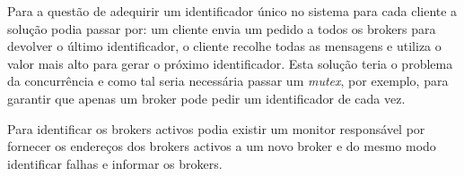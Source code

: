 Para a questão de adequirir um identificador único no sistema para cada cliente a solução podia passar por:
um cliente envia um pedido a todos os brokers para devolver o último identificador, o cliente recolhe todas as mensagens e utiliza o valor mais alto para gerar o próximo identificador. Esta solução teria o problema da concurrência e como tal seria necessária passar um \textit{mutex}, por exemplo, para garantir que apenas um broker pode pedir um identificador de cada vez.

Para identificar os brokers activos podia existir um monitor responsável por fornecer os endereços dos brokers activos a um novo broker e do mesmo modo identificar falhas e informar os brokers.